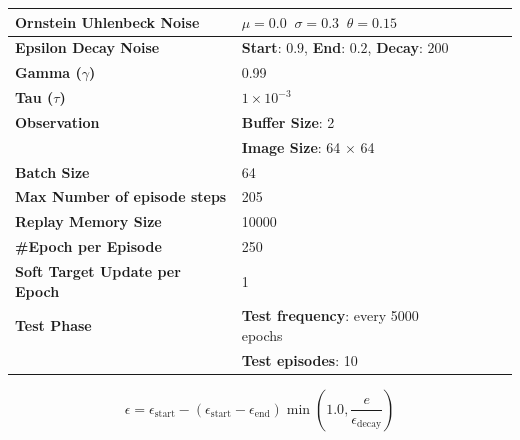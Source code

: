 \begin{table}[!h]
{\begin{tabular}{@{}lllll@{}}
			\textbf{Ornstein Uhlenbeck Noise}     & $\mu = 0.0 \;\; \sigma = 0.3 \;\; \theta = 0.15$                  \\\midrule
			\textbf{Epsilon Decay Noise}          & \textbf{Start}: $0.9$, \textbf{End}: $0.2$, \textbf{Decay}: $200$ \\\midrule
			\textbf{Gamma ($\gamma$)}             & 0.99                                                              \\\midrule
			\textbf{Tau ($\tau$)}                 & $1 \times 10^{-3}$                                                \\\midrule
			\textbf{Observation}                  & \textbf{Buffer Size}: 2                                           \\
			                                      & \textbf{Image Size}: 64 $\times$ 64                               \\\midrule
			\textbf{Batch Size}                   & 64                                                                \\\midrule
			\textbf{Max Number of episode steps}  & 205                                                               \\\midrule
			\textbf{Replay Memory Size}           & 10000                                                             \\\midrule

			\textbf{\#Epoch per Episode}          & 250                                                               \\\midrule
			\textbf{Soft Target Update per Epoch} & 1                                                                 \\\midrule
			\textbf{Test Phase}                   & \textbf{Test frequency}: every 5000 epochs                        \\
			                                      & \textbf{Test episodes}: 10                                        \\
			\bottomrule
		\end{tabular}}
\end{table}

\begin{equation}
	\label{eq:epsilon_decay}
	\epsilon = \epsilon_{\text{start}} - (\epsilon_{\text{start}} -\epsilon_{\text{end}})\min(1.0, \frac{e}{\epsilon_{\text{decay}}})
\end{equation}

\FloatBarrier

